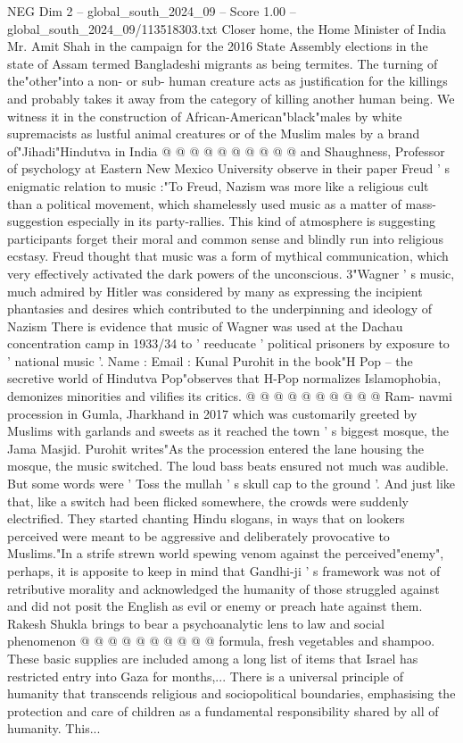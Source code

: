 \begin{textsample}{NEG Dim 2 – global\_south\_2024\_09 – Score 1.00 – global\_south\_2024\_09/113518303.txt}
Closer home, the Home Minister of India Mr.
Amit Shah in the campaign for the 2016 State Assembly elections in the state of Assam termed Bangladeshi migrants as being termites.
The turning of the"other"into a non- or sub- human creature acts as justification for the killings and probably takes it away from the category of killing another human being.
We witness it in the construction of African-American"black"males by white supremacists as lustful animal creatures or of the Muslim males by a brand of"Jihadi"Hindutva in India @ @ @ @ @ @ @ @ @ @ and Shaughness, Professor of psychology at Eastern New Mexico University observe in their paper Freud ' s enigmatic relation to music :"To Freud, Nazism was more like a religious cult than a political movement, which shamelessly used music as a matter of mass-suggestion especially in its party-rallies.
This kind of atmosphere is suggesting participants forget their moral and common sense and blindly run into religious ecstasy.
Freud thought that music was a form of mythical communication, which very effectively activated the dark powers of the unconscious. 3"Wagner ' s music, much admired by Hitler was considered by many as expressing the incipient phantasies and desires which contributed to the underpinning and ideology of Nazism There is evidence that music of Wagner was used at the Dachau concentration camp in 1933/34 to ' reeducate ' political prisoners by exposure to ' national music '.
Name : Email : Kunal Purohit in the book"H Pop -- the secretive world of Hindutva Pop"observes that H-Pop normalizes Islamophobia, demonizes minorities and vilifies its critics. @ @ @ @ @ @ @ @ @ @ Ram- navmi procession in Gumla, Jharkhand in 2017 which was customarily greeted by Muslims with garlands and sweets as it reached the town ' s biggest mosque, the Jama Masjid.
Purohit writes"As the procession entered the lane housing the mosque, the music switched.
The loud bass beats ensured not much was audible.
But some words were ' Toss the mullah ' s skull cap to the ground '.
And just like that, like a switch had been flicked somewhere, the crowds were suddenly electrified.
They started chanting Hindu slogans, in ways that on lookers perceived were meant to be aggressive and deliberately provocative to Muslims."In a strife strewn world spewing venom against the perceived"enemy", perhaps, it is apposite to keep in mind that Gandhi-ji ' s framework was not of retributive morality and acknowledged the humanity of those struggled against and did not posit the English as evil or enemy or preach hate against them.
Rakesh Shukla brings to bear a psychoanalytic lens to law and social phenomenon @ @ @ @ @ @ @ @ @ @ formula, fresh vegetables and shampoo.
These basic supplies are included among a long list of items that Israel has restricted entry into Gaza for months,...
There is a universal principle of humanity that transcends religious and sociopolitical boundaries, emphasising the protection and care of children as a fundamental responsibility shared by all of humanity.
This...

\end{textsample}
